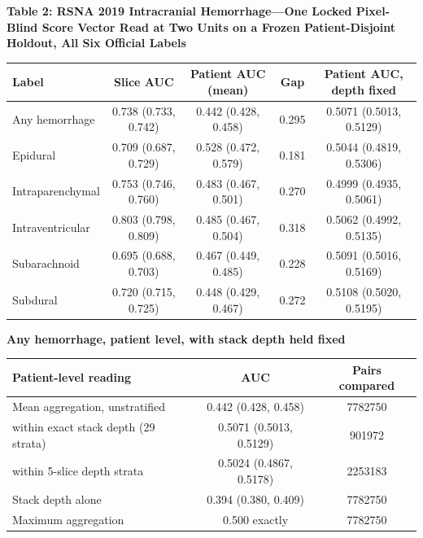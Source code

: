 \documentclass[11pt,letterpaper]{article}
\begin{document}
\clearpage
\begin{singlespace}
\small

\textbf{Table 2: RSNA 2019 Intracranial Hemorrhage---One Locked Pixel-Blind Score
Vector Read at Two Units on a Frozen Patient-Disjoint Holdout, All Six Official
Labels}

\vspace{0.5em}

\setlength{\tabcolsep}{4pt}
\begin{tabular}{lcccc}
\toprule
Label & Slice AUC & Patient AUC (mean) & Gap & Patient AUC, depth fixed\\
\midrule
Any hemorrhage   & 0.738 (0.733, 0.742) & 0.442 (0.428, 0.458) & 0.295 & 0.5071 (0.5013, 0.5129)\\
Epidural         & 0.709 (0.687, 0.729) & 0.528 (0.472, 0.579) & 0.181 & 0.5044 (0.4819, 0.5306)\\
Intraparenchymal & 0.753 (0.746, 0.760) & 0.483 (0.467, 0.501) & 0.270 & 0.4999 (0.4935, 0.5061)\\
Intraventricular & 0.803 (0.798, 0.809) & 0.485 (0.467, 0.504) & 0.318 & 0.5062 (0.4992, 0.5135)\\
Subarachnoid     & 0.695 (0.688, 0.703) & 0.467 (0.449, 0.485) & 0.228 & 0.5091 (0.5016, 0.5169)\\
Subdural         & 0.720 (0.715, 0.725) & 0.448 (0.429, 0.467) & 0.272 & 0.5108 (0.5020, 0.5195)\\
\bottomrule
\end{tabular}

\vspace{0.8em}

\textbf{Any hemorrhage, patient level, with stack depth held fixed}

\vspace{0.4em}

\begin{tabular}{lcc}
\toprule
Patient-level reading & AUC & Pairs compared\\
\midrule
Mean aggregation, unstratified              & 0.442 (0.428, 0.458) & \num{7782750}\\
\quad within exact stack depth (29 strata)  & 0.5071 (0.5013, 0.5129) & \num{901972}\\
\quad within 5-slice depth strata           & 0.5024 (0.4867, 0.5178) & \num{2253183}\\
Stack depth alone                           & 0.394 (0.380, 0.409) & \num{7782750}\\
Maximum aggregation                         & 0.500 exactly & \num{7782750}\\
\bottomrule
\end{tabular}


\end{singlespace}
\end{document}
